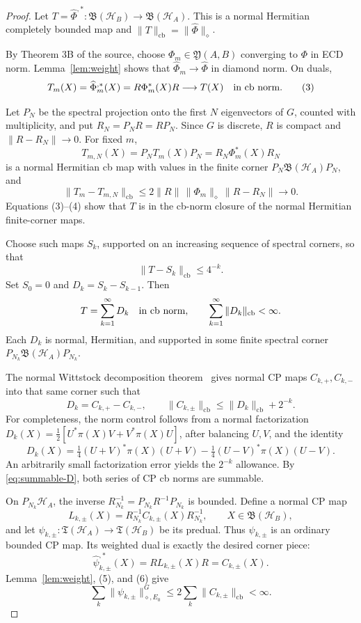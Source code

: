 \documentclass[11pt]{article}
\newcommand{\T}{\mathfrak T}
\newcommand{\Y}{\mathfrak Y}
\newcommand{\B}{\mathfrak B}
\newcommand{\cH}{\mathcal H}
\newcommand{\cb}{\mathrm{cb}}
\begin{document}
\begin{proof}
Let $T=\widehat\Phi^{,*}:\B(\cH_B)\to\B(\cH_A)$.  This is a normal
Hermitian completely bounded map and
$\|T\|_{\cb}=\|\widehat\Phi\|_\diamond$.

By Theorem 3B of the source, choose
$\Phi_m\in\Y(A,B)$ converging to $\Phi$ in ECD norm.  Lemma~\ref{lem:weight}
shows that $\widehat\Phi_m\to\widehat\Phi$ in diamond norm.  On duals,
\[
 T_m(X)=\widehat\Phi_m^{,*}(X)=R\Phi_m^*(X)R
 \longrightarrow T(X)
 \quad\hbox{in cb norm}.                                      \tag{3}
\]

Let $P_N$ be the spectral projection onto the first $N$ eigenvectors of
$G$, counted with multiplicity, and put $R_N=P_NR=RP_N$.  Since $G$ is
discrete, $R$ is compact and $\|R-R_N\|\to0$.  For fixed $m$,
\[
 T_{m,N}(X)=P_NT_m(X)P_N=R_N\Phi_m^*(X)R_N
\]
is a normal Hermitian cb map with values in the finite corner
$P_N\B(\cH_A)P_N$, and
\[
 \|T_m-T_{m,N}\|_{\cb}
 \leq 2\|R\|\,\|\Phi_m\|_\diamond\,\|R-R_N\|\longrightarrow0. \tag{4}
\]
Equations (3)--(4) show that $T$ is in the cb-norm closure of the normal
Hermitian finite-corner maps.

Choose such maps $S_k$, supported on an increasing sequence of spectral
corners, so that
\[
 \|T-S_k\|_{\cb}\leq4^{-k}.
\]
Set $S_0=0$ and $D_k=S_k-S_{k-1}$.  Then
\begin{equation}\label{eq:summable-D}
 T=\sum_{k=1}^{\infty}D_k
 \quad\hbox{in cb norm},\qquad
 \sum_{k=1}^{\infty}\|D_k\|_{\cb}<\infty.                 
\end{equation}
Each $D_k$ is normal, Hermitian, and supported in some finite spectral
corner $P_{N_k}\B(\cH_A)P_{N_k}$.

The normal Wittstock decomposition theorem~\cite{Paulsen,Wittstock} gives
normal CP maps $C_{k,+},C_{k,-}$ into that same corner such that
\[
 D_k=C_{k,+}-C_{k,-},
 \qquad
 \|C_{k,\pm}\|_{\cb}\leq\|D_k\|_{\cb}+2^{-k}.            \tag{5}
\]
For completeness, the norm control follows from a normal factorization
$D_k(X)=\tfrac12[U^*\pi(X)V+V^*\pi(X)U]$, after balancing $U,V$, and the
identity
\[
 D_k(X)=\tfrac14(U+V)^*\pi(X)(U+V)
       -\tfrac14(U-V)^*\pi(X)(U-V).
\]
An arbitrarily small factorization error yields the $2^{-k}$ allowance.
By \eqref{eq:summable-D}, both series of CP cb norms are summable.

On $P_{N_k}\cH_A$, the inverse
$R_{N_k}^{-1}=P_{N_k}R^{-1}P_{N_k}$ is bounded.  Define a normal CP map
\[
 L_{k,\pm}(X)=R_{N_k}^{-1}C_{k,\pm}(X)R_{N_k}^{-1},
 \qquad X\in\B(\cH_B),
\]
and let $\psi_{k,\pm}:\T(\cH_A)\to\T(\cH_B)$ be its predual.  Thus
$\psi_{k,\pm}$ is an ordinary bounded CP map.  Its weighted dual is exactly
the desired corner piece:
\[
 \widehat\psi_{k,\pm}^{,*}(X)
 =RL_{k,\pm}(X)R=C_{k,\pm}(X).                              \tag{6}
\]
Lemma~\ref{lem:weight}, (5), and (6) give
\[
 \sum_k\|\psi_{k,\pm}\|_{\diamond,E_0}^{G}
 \leq2\sum_k\|C_{k,\pm}\|_{\cb}<\infty.                 \tag{7}
\]


\end{proof}
\end{document}
